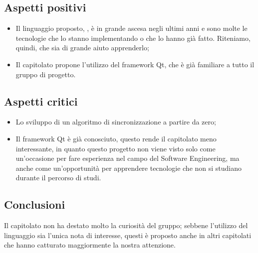 \subsection{Aspetti positivi}
\begin{itemize}
\item Il linguaggio proposto, , è in grande ascesa negli ultimi anni e sono molte le tecnologie che lo stanno implementando o che lo hanno già fatto. Riteniamo, quindi, che sia di grande aiuto apprenderlo;
\item Il capitolato propone l'utilizzo del framework Qt, che è già familiare a tutto il gruppo di progetto.
\end{itemize}

\subsection{Aspetti critici}
\begin{itemize}
\item Lo sviluppo di un algoritmo di sincronizzazione a partire da zero;
\item Il framework Qt è già conosciuto, questo rende il capitolato meno interessante, in quanto questo progetto non viene visto solo come un'occasione per fare esperienza nel campo del Software Engineering, ma anche come un'opportunità per apprendere tecnologie che non si studiano durante il percorso di studi.
\end{itemize}

\subsection{Conclusioni}
Il capitolato non ha destato molto la curiosità del gruppo; sebbene l'utilizzo del linguaggio  sia l'unica nota di interesse, questi è proposto anche in altri capitolati che hanno catturato maggiormente la nostra attenzione.
